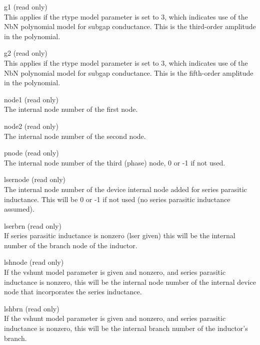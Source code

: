 \begin{description}
\item{\vt g1} (read only)\\
This applies if the {\vt rtype} model parameter is set to 3, which
indicates use of the NbN polynomial model for subgap conductance. 
This is the third-order amplitude in the polynomial.

\item{\vt g2} (read only)\\
This applies if the {\vt rtype} model parameter is set to 3, which
indicates use of the NbN polynomial model for subgap conductance. 
This is the fifth-order amplitude in the polynomial.

\item{\vt node1} (read only)\\
The internal node number of the first node.

\item{\vt node2} (read only)\\
The internal node number of the second node.

\item{\vt pnode} (read only)\\
The internal node number of the third (phase) node, 0 or -1 if not
used.

\item{\vt lsernode} (read only)\\
The internal node number of the device internal node added for series
parasitic inductance.  This will be 0 or -1 if not used (no series
parasitic inductance assumed).

\item{\vt lserbrn} (read only)\\
If series parasitic inductance is nonzero ({\vt lser} given) this will
be the internal number of the branch node of the inductor.

\item{\vt lshnode} (read only)\\
If the {\vt vshunt} model parameter is given and nonzero, and series
parasitic inductance is nonzero, this will be the internal node number
of the internal device node that incorporates the series inductance.

\item{\vt lshbrn} (read only)\\
If the {\vt vshunt} model parameter is given and nonzero, and series
parasitic inductance is nonzero, this will be the internal branch
number of the inductor's branch.
\end{description}

